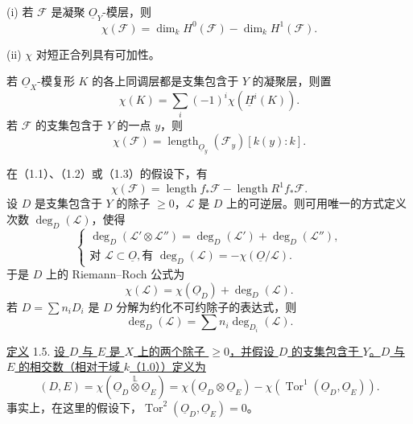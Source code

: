 (i) 若 $\mathcal F$ 是凝聚 $\underline{O}_Y$-模层，则
\begin{equation}\tag{1.4.1}
\chi(\mathcal F)=\dim_k H^0(\mathcal F)-\dim_k H^1(\mathcal F).
\end{equation}

(ii) $\chi$ 对短正合列具有可加性。

若 $\underline{O}_X$-模复形 $K$ 的各上同调层都是支集包含于 $Y$ 的凝聚层，则置
\begin{equation}\tag{1.4.2}
\chi(K)=\sum_i(-1)^i\chi(\underline{H}^i(K)).
\end{equation}
若 $\mathcal F$ 的支集包含于 $Y$ 的一点 $y$，则
\begin{equation}\tag{1.4.3}
\chi(\mathcal F)=\operatorname{length}_{\underline{O}_y}(\mathcal F_y)[k(y):k].
\end{equation}


在（1.1）、（1.2）或（1.3）的假设下，有
\begin{equation}\tag{1.4.4}
\chi(\mathcal F)=\operatorname{length}f_*\mathcal F-
\operatorname{length}R^1f_*\mathcal F.
\end{equation}
设 $D$ 是支集包含于 $Y$ 的除子 $\geq0$，$\mathcal L$ 是 $D$ 上的可逆层。则可用唯一的方式定义次数 $\deg_D(\mathcal L)$，使得
\begin{equation}\tag{1.4.5}
\left\{
\begin{array}{l}
\deg_D(\mathcal L'\otimes\mathcal L'')=
\deg_D(\mathcal L')+\deg_D(\mathcal L''),\\[3ex]
\text{对 }\mathcal L\subset\underline O,
\text{有 }\deg_D(\mathcal L)=-\chi(\underline O/\mathcal L).
\end{array}
\right.
\end{equation}
于是 $D$ 上的 Riemann--Roch 公式为
\begin{equation}\tag{1.4.6}
\chi(\mathcal L)=\chi(\underline{O}_D)+\deg_D(\mathcal L).
\end{equation}
若 $D=\sum n_iD_i$ 是 $D$ 分解为约化不可约除子的表达式，则
\begin{equation}\tag{1.4.7}
\deg_D(\mathcal L)=\sum n_i\deg_{D_i}(\mathcal L).
\end{equation}

\underline{定义} 1.5. \underline{设 $D$ 与 $E$ 是 $X$ 上的两个除子 $\geq0$，并假设 $D$ 的支集包含于 $Y$。$D$ 与 $E$ 的相交数（相对于域 $k$（1.0））定义为}
\begin{equation*}
(D,E)=\chi(\underline{O}_D\overset{\mathbb L}{\otimes}\underline{O}_E)
=\chi(\underline{O}_D\otimes\underline{O}_E)
-\chi(\operatorname{Tor}^1(\underline{O}_D,\underline{O}_E)).
\end{equation*}
事实上，在这里的假设下，$\operatorname{Tor}^2(\underline{O}_D,\underline{O}_E)=0$。

